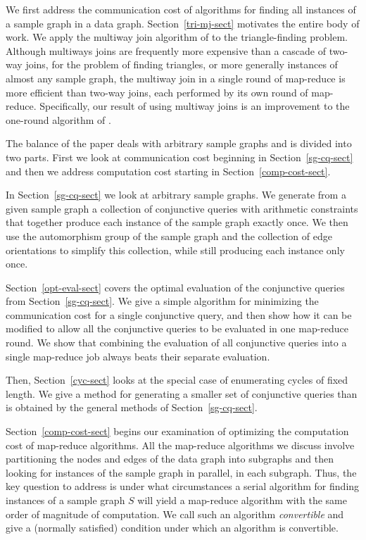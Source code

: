 We first address the communication cost of algorithms for finding all instances of a sample graph in a data graph.  Section~\ref{tri-mj-sect} motivates the entire body of work.  We apply the multiway join algorithm of \cite{AU10} to the triangle-finding problem.  Although multiways joins are frequently more expensive than a cascade of two-way joins, for the problem of finding triangles, or more generally instances of almost any sample graph, the multiway join in a single round of map-reduce is more efficient than two-way joins, each performed by its own round of map-reduce.
Specifically, our result of using multiway joins is an improvement to the one-round algorithm of \cite{SV11}.

The balance of the paper deals with arbitrary sample graphs and is divided into two parts. First we look at communication cost beginning in Section~\ref{sg-cq-sect} and then we address computation cost starting in Section~\ref{comp-cost-sect}.

In Section~\ref{sg-cq-sect} we look at arbitrary sample graphs.  We generate from a given sample graph a collection of conjunctive queries with arithmetic constraints that together produce each instance of the sample graph exactly once.  We then use the automorphism group of the sample graph and the collection of edge orientations to simplify this collection, while still producing each instance only once.

Section~\ref{opt-eval-sect} covers the optimal evaluation of the conjunctive queries from Section~\ref{sg-cq-sect}.  We give a simple algorithm for minimizing the communication cost for a single conjunctive query, and then show how it can be modified to allow all the conjunctive queries to be evaluated in one map-reduce round.
We show that combining the evaluation of all conjunctive queries into a single map-reduce job always beats their separate evaluation.

Then, Section~\ref{cyc-sect} looks at the special case of enumerating cycles of fixed length.  We give a method for generating a smaller set of conjunctive queries than is obtained by the general methods of Section~\ref{sg-cq-sect}.

Section~\ref{comp-cost-sect} begins our examination of optimizing the computation cost of map-reduce algorithms.  All the map-reduce algorithms we discuss involve partitioning the nodes and edges of the data graph into subgraphs and then looking for instances of the sample graph in parallel, in each subgraph.  Thus, the key question to address is under what circumstances a serial algorithm for finding instances of a sample graph $S$ will yield a map-reduce algorithm with the same order of magnitude of computation.  We call such an algorithm {\em convertible}  and give a (normally satisfied) condition under which an algorithm is convertible.

